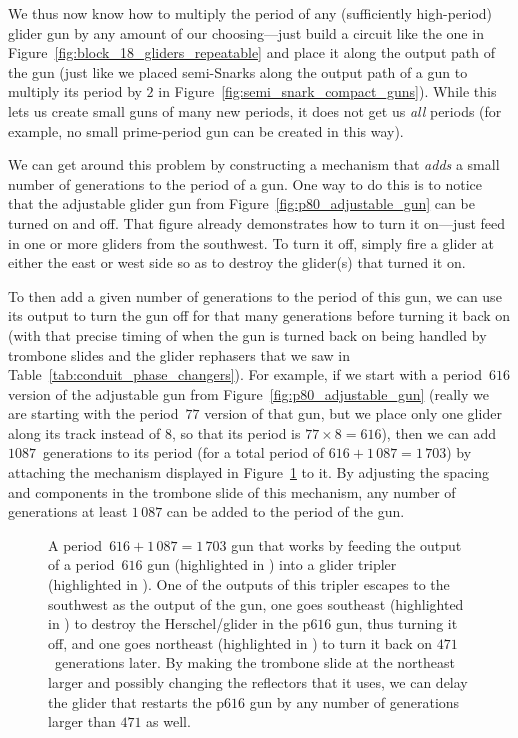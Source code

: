 We thus now know how to multiply the period of any (sufficiently high-period) glider gun by any amount of our choosing---just build a circuit like the one in Figure~\ref{fig:block_18_gliders_repeatable} and place it along the output path of the gun (just like we placed semi-Snarks along the output path of a gun to multiply its period by $2$ in Figure~\ref{fig:semi_snark_compact_guns}). While this lets us create small guns of many new periods, it does not get us \emph{all} periods (for example, no small prime-period gun can be created in this way).

We can get around this problem by constructing a mechanism that \emph{adds} a small number of generations to the period of a gun. One way to do this is to notice that the adjustable glider gun from Figure~\ref{fig:p80_adjustable_gun} can be turned on and off. That figure already demonstrates how to turn it on---just feed in one or more gliders from the southwest. To turn it off, simply fire a glider at either the east or west side so as to destroy the glider(s) that turned it on.

To then add a given number of generations to the period of this gun, we can use its output to turn the gun off for that many generations before turning it back on (with that precise timing of when the gun is turned back on being handled by trombone slides and the glider rephasers that we saw in Table~\ref{tab:conduit_phase_changers}). For example, if we start with a period~$616$ version of the adjustable gun from Figure~\ref{fig:p80_adjustable_gun} (really we are starting with the period~$77$ version of that gun, but we place only one glider along its track instead of $8$, so that its period is $77 \times 8 = 616$), then we can add $1 087$~generations to its period (for a total period of $616+1\, 087 = 1\, 703$) by attaching the mechanism displayed in Figure~\ref{fig:p1703_gun} to it. By adjusting the spacing and components in the trombone slide of this mechanism, any number of generations at least $1\, 087$ can be added to the period of the gun.

\begin{figure}[!htb]
	\centering
	\caption{A period~$616+1\, 087 = 1\, 703$ gun that works by feeding the output of a period~$616$ gun (highlighted in ) into a glider tripler (highlighted in ). One of the outputs of this tripler escapes to the southwest as the output of the gun, one goes southeast (highlighted in ) to destroy the Herschel/glider in the p$616$ gun, thus turning it off, and one goes northeast (highlighted in ) to turn it back on $471$~generations later. By making the trombone slide at the northeast larger and possibly changing the reflectors that it uses, we can delay the glider that restarts the p$616$ gun by any number of generations larger than $471$ as well.}
	\label{fig:p1703_gun}
\end{figure}

